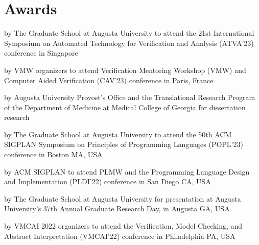 \documentclass[10pt,letterpaper,roman]{moderncv}
\begin{document}


\section{Awards}

{by The Graduate School at Augusta University}
{to attend the 21st International Symposium on Automated Technology for Verification and Analysis (ATVA'23) conference in Singapore}{}{}

{by VMW organizers}
{to attend Verification Mentoring Workshop (VMW) and Computer Aided Verification (CAV'23) conference in Paris, France}{}{}

{by Augusta University Provost's Office and the Translational Research Program of the Department of Medicine at Medical College of Georgia}
{for dissertation research}{}{}

{by The Graduate School at Augusta University}
{to attend the 50th ACM SIGPLAN Symposium on Principles of Programming Languages (POPL'23) conference in Boston MA, USA}{}{}

{by ACM SIGPLAN}
{to attend PLMW and the Programming Language Design and Implementation (PLDI'22) conference in San Diego CA, USA}{}{}

{by The Graduate School at Augusta University}
{for presentation at Augusta University's 37th Annual Graduate Research Day, in Augusta GA, USA}{}{}

{by VMCAI 2022 organizers}
{to attend the Verification, Model Checking, and Abstract Interpretation (VMCAI'22) conference in Philadelphia PA, USA}{}{}
\end{document}
